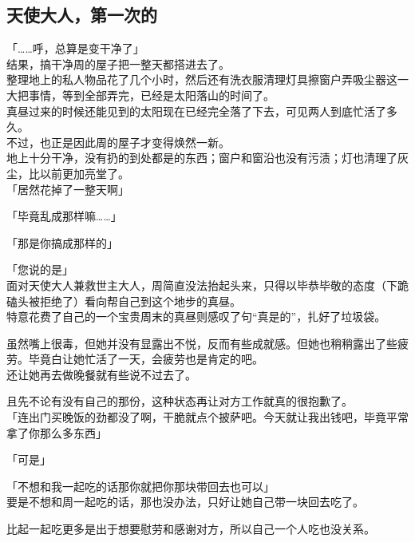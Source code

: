 \subsection{天使大人，第一次的}

「……呼，总算是变干净了」\\

结果，搞干净周的屋子把一整天都搭进去了。\\

整理地上的私人物品花了几个小时，然后还有洗衣服清理灯具擦窗户弄吸尘器这一大把事情，等到全部弄完，已经是太阳落山的时间了。\\

真昼过来的时候还能见到的太阳现在已经完全落了下去，可见两人到底忙活了多久。\\

不过，也正是因此周的屋子才变得焕然一新。\\

地上十分干净，没有扔的到处都是的东西；窗户和窗沿也没有污渍；灯也清理了灰尘，比以前更加亮堂了。\\

「居然花掉了一整天啊」

「毕竟乱成那样嘛……」

「那是你搞成那样的」

「您说的是」\\

面对天使大人兼救世主大人，周简直没法抬起头来，只得以毕恭毕敬的态度（下跪磕头被拒绝了）看向帮自己到这个地步的真昼。\\

特意花费了自己的一个宝贵周末的真昼则感叹了句“真是的”，扎好了垃圾袋。

虽然嘴上很毒，但她并没有显露出不悦，反而有些成就感。但她也稍稍露出了些疲劳。毕竟白让她忙活了一天，会疲劳也是肯定的吧。\\

还让她再去做晚餐就有些说不过去了。

且先不论有没有自己的那份，这种状态再让对方工作就真的很抱歉了。\\

「连出门买晚饭的劲都没了啊，干脆就点个披萨吧。今天就让我出钱吧，毕竟平常拿了你那么多东西」

「可是」

「不想和我一起吃的话那你就把你那块带回去也可以」\\

要是不想和周一起吃的话，那也没办法，只好让她自己带一块回去吃了。

比起一起吃更多是出于想要慰劳和感谢对方，所以自己一个人吃也没关系。\\

